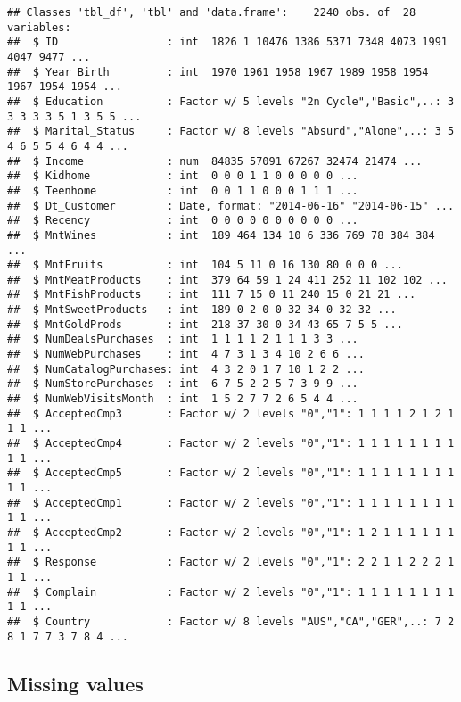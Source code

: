 \documentclass[]{article}
\newenvironment{Shaded}{\begin{snugshade}}{\end{snugshade}}
\newcommand{\CommentTok}[1]{\textcolor[rgb]{0.56,0.35,0.01}{\textit{#1}}}
\newcommand{\DataTypeTok}[1]{\textcolor[rgb]{0.13,0.29,0.53}{#1}}
\newcommand{\KeywordTok}[1]{\textcolor[rgb]{0.13,0.29,0.53}{\textbf{#1}}}
\newcommand{\NormalTok}[1]{#1}
\newcommand{\OperatorTok}[1]{\textcolor[rgb]{0.81,0.36,0.00}{\textbf{#1}}}
\newcommand{\StringTok}[1]{\textcolor[rgb]{0.31,0.60,0.02}{#1}}
\begin{document}
\begin{verbatim}
## Classes 'tbl_df', 'tbl' and 'data.frame':    2240 obs. of  28 variables:
##  $ ID                 : int  1826 1 10476 1386 5371 7348 4073 1991 4047 9477 ...
##  $ Year_Birth         : int  1970 1961 1958 1967 1989 1958 1954 1967 1954 1954 ...
##  $ Education          : Factor w/ 5 levels "2n Cycle","Basic",..: 3 3 3 3 3 5 1 3 5 5 ...
##  $ Marital_Status     : Factor w/ 8 levels "Absurd","Alone",..: 3 5 4 6 5 5 4 6 4 4 ...
##  $ Income             : num  84835 57091 67267 32474 21474 ...
##  $ Kidhome            : int  0 0 0 1 1 0 0 0 0 0 ...
##  $ Teenhome           : int  0 0 1 1 0 0 0 1 1 1 ...
##  $ Dt_Customer        : Date, format: "2014-06-16" "2014-06-15" ...
##  $ Recency            : int  0 0 0 0 0 0 0 0 0 0 ...
##  $ MntWines           : int  189 464 134 10 6 336 769 78 384 384 ...
##  $ MntFruits          : int  104 5 11 0 16 130 80 0 0 0 ...
##  $ MntMeatProducts    : int  379 64 59 1 24 411 252 11 102 102 ...
##  $ MntFishProducts    : int  111 7 15 0 11 240 15 0 21 21 ...
##  $ MntSweetProducts   : int  189 0 2 0 0 32 34 0 32 32 ...
##  $ MntGoldProds       : int  218 37 30 0 34 43 65 7 5 5 ...
##  $ NumDealsPurchases  : int  1 1 1 1 2 1 1 1 3 3 ...
##  $ NumWebPurchases    : int  4 7 3 1 3 4 10 2 6 6 ...
##  $ NumCatalogPurchases: int  4 3 2 0 1 7 10 1 2 2 ...
##  $ NumStorePurchases  : int  6 7 5 2 2 5 7 3 9 9 ...
##  $ NumWebVisitsMonth  : int  1 5 2 7 7 2 6 5 4 4 ...
##  $ AcceptedCmp3       : Factor w/ 2 levels "0","1": 1 1 1 1 2 1 2 1 1 1 ...
##  $ AcceptedCmp4       : Factor w/ 2 levels "0","1": 1 1 1 1 1 1 1 1 1 1 ...
##  $ AcceptedCmp5       : Factor w/ 2 levels "0","1": 1 1 1 1 1 1 1 1 1 1 ...
##  $ AcceptedCmp1       : Factor w/ 2 levels "0","1": 1 1 1 1 1 1 1 1 1 1 ...
##  $ AcceptedCmp2       : Factor w/ 2 levels "0","1": 1 2 1 1 1 1 1 1 1 1 ...
##  $ Response           : Factor w/ 2 levels "0","1": 2 2 1 1 2 2 2 1 1 1 ...
##  $ Complain           : Factor w/ 2 levels "0","1": 1 1 1 1 1 1 1 1 1 1 ...
##  $ Country            : Factor w/ 8 levels "AUS","CA","GER",..: 7 2 8 1 7 7 3 7 8 4 ...
\end{verbatim}

\hypertarget{missing-values}{%
\subsection{Missing values}\label{missing-values}}

\begin{Shaded}
\end{Shaded}
\end{document}
